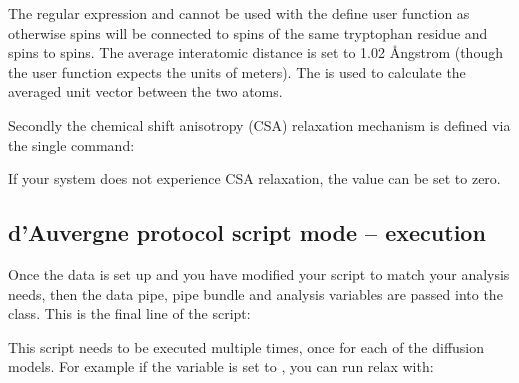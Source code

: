 \begin{htmlonly}
\begin{htmlonly}
The regular expression  and  cannot be used with the  define user function as otherwise  spins will be connected to  spins of the same tryptophan residue and  spins to  spins.  The average interatomic distance is set to 1.02 \AA ngstrom (though the  user function expects the units of meters).  The  is used to calculate the averaged unit vector between the two atoms.

Secondly the chemical shift anisotropy (CSA) relaxation mechanism is defined via the single command:


If your system does not experience CSA relaxation, the value can be set to zero.


\subsection{d'Auvergne protocol script mode -- execution}

Once the data is set up and you have modified your script to match your analysis needs, then the data pipe, pipe bundle and analysis variables are passed into the  class.  This is the final line of the script:


This script needs to be executed multiple times, once for each of the diffusion models.  For example if the  variable is set to , you can run relax with:



\end{htmlonly}
\end{htmlonly}
